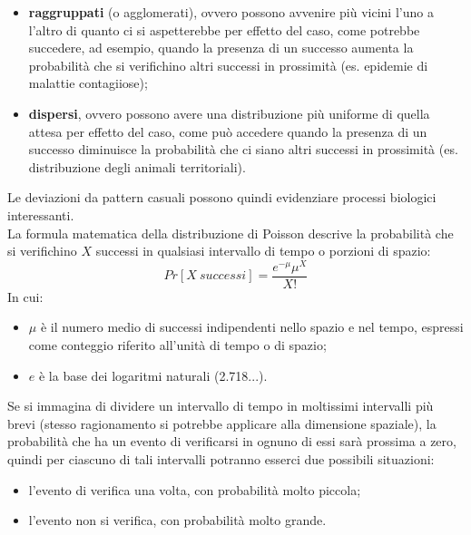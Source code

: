 \documentclass[drafts, 10pt]{book}
\begin{document}
\begin{itemize}
    \item \textbf{raggruppati} (o agglomerati), ovvero possono avvenire più vicini l'uno a l'altro di quanto ci si aspetterebbe per effetto del caso, come potrebbe succedere, ad esempio, quando la presenza di un successo aumenta la probabilità che si verifichino altri successi in prossimità (es. epidemie di malattie contagiiose);
    \item \textbf{dispersi}, ovvero possono avere una distribuzione più uniforme di quella attesa per effetto del caso, come può accedere quando la presenza di un successo diminuisce la probabilità che ci siano altri successi in prossimità (es. distribuzione degli animali territoriali).
\end{itemize}
Le deviazioni da pattern casuali possono quindi evidenziare processi biologici interessanti.
\\
La formula matematica della distribuzione di Poisson descrive la probabilità che si verifichino $X$ successi in qualsiasi intervallo di tempo o porzioni di spazio:
\begin{equation}
Pr[X\ successi] = \frac{e^{-\mu}\mu^X}{X!}
\end{equation}
In cui:
\begin{itemize}
    \item \textbf{$\mu$} è il numero medio di successi indipendenti nello spazio e nel tempo, espressi come conteggio riferito all'unità di tempo o di spazio;
    \item \textbf{$e$} è la base dei logaritmi naturali (2.718...).
\end{itemize}
Se si immagina di dividere un intervallo di tempo in moltissimi intervalli più brevi (stesso ragionamento si potrebbe applicare alla dimensione spaziale), la probabilità che ha un evento di verificarsi in ognuno di essi sarà prossima a zero, quindi per ciascuno di tali intervalli potranno esserci due possibili situazioni:
\begin{itemize}
    \item l'evento di verifica una volta, con probabilità molto piccola;
    \item l'evento non si verifica, con probabilità molto grande.
\end{itemize}
\end{document}
